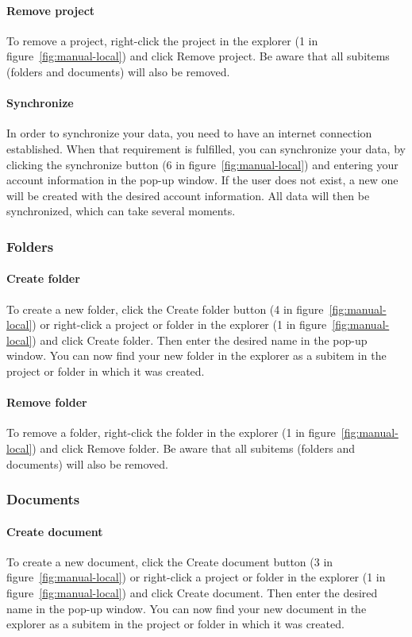 	\paragraph{Remove project}
	To remove a project, right-click the project in the explorer (1 in figure~\ref{fig:manual-local}) and click Remove project. Be aware that all subitems (folders and documents) will also be removed.

	\paragraph{Synchronize}
	In order to synchronize your data, you need to have an internet connection established. When that requirement is fulfilled, you can synchronize your data, by clicking the synchronize button (6 in figure~\ref{fig:manual-local}) and entering your account information in the pop-up window. If the user does not exist, a new one will be created with the desired account information. All data will then be synchronized, which can take several moments.

\subsubsection{Folders}

	\paragraph{Create folder}
	To create a new folder, click the Create folder button (4 in figure~\ref{fig:manual-local}) or right-click a project or folder in the explorer (1 in figure~\ref{fig:manual-local}) and click Create folder. Then enter the desired name in the pop-up window. You can now find your new folder in the explorer as a subitem in the project or folder in which it was created.

	\paragraph{Remove folder}
	To remove a folder, right-click the folder in the explorer (1 in figure~\ref{fig:manual-local}) and click Remove folder.  Be aware that all subitems (folders and documents) will also be removed.

\subsubsection{Documents}

	\paragraph{Create document}
	To create a new document, click the Create document button (3 in figure~\ref{fig:manual-local}) or right-click a project or folder in the explorer (1 in figure~\ref{fig:manual-local}) and click Create document. Then enter the desired name in the pop-up window. You can now find your new document in the explorer as a subitem in the project or folder in which it was created.
	
